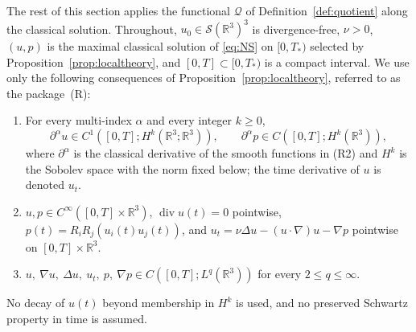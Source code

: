 \documentclass[11pt]{article}
\theoremstyle{definition}
\theoremstyle{plain}
\newcommand{\R}{\mathbb R}
\begin{document}
The rest of this section applies the functional $\mathcal Q$ of
Definition~\ref{def:quotient} along the classical solution.  Throughout,
$u_0\in\mathcal S(\R^3)^3$ is divergence-free, $\nu>0$, $(u,p)$ is the
maximal classical solution of \eqref{eq:NS} on $[0,T_*)$ selected by
Proposition~\ref{prop:localtheory}, and $[0,T]\subset[0,T_*)$ is a compact
interval.  We use only the following consequences of
Proposition~\ref{prop:localtheory}, referred to as the package~(R):
\begin{enumerate}
\item[(R1)] For every multi-index $\alpha$ and every integer $k\ge0$,
 \[
  \partial^\alpha u\in C^1([0,T];H^k(\R^3;\R^3)),
  \qquad
  \partial^\alpha p\in C([0,T];H^k(\R^3)),
 \]
 where $\partial^\alpha$ is the classical derivative of the smooth
 functions in (R2) and $H^k$ is the Sobolev space with the norm fixed
 below; the time derivative of $u$ is denoted $u_t$.
\item[(R2)] $u,p\in C^\infty([0,T]\times\R^3)$, $\operatorname{div}u(t)=0$
 pointwise, $p(t)=R_iR_j(u_i(t)u_j(t))$, and
 $u_t=\nu\Delta u-(u\cdot\nabla)u-\nabla p$ pointwise on $[0,T]\times\R^3$.
\item[(R3)] $u,\ \nabla u,\ \Delta u,\ u_t,\ p,\ \nabla p\in C([0,T];L^q(\R^3))$
 for every $2\le q\le\infty$.
\end{enumerate}
No decay of $u(t)$ beyond membership in $H^k$ is used, and no preserved
Schwartz property in time is assumed.
\end{document}
